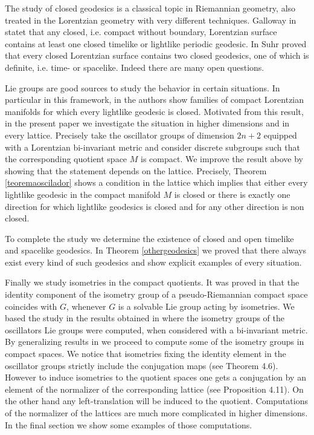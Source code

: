 \documentclass[12pt]{amsart}
\theoremstyle{plain}
\theoremstyle{definition}
\theoremstyle{remark}
\begin{document}
	The study of closed geodesics is a classical topic in Riemannian geometry, also treated in the Lorentzian geometry with very different techniques. Galloway in \cite{Ga}
	statet that any closed, i.e. compact without boundary, Lorentzian surface contains
	at least one closed timelike or lightlike periodic geodesic. In \cite{Su} Suhr proved that every closed Lorentzian surface contains two closed geodesics, one of
	which is definite, i.e. time- or spacelike. Indeed there are many open questions. 
	
	Lie groups are good sources to study the behavior in certain situations. In particular in this framework, in \cite{BOV} the authors show families of compact Lorentzian manifolds for which every lightlike geodesic is closed. Motivated from this result, in the present paper we investigate the situation in higher dimensions and in every lattice. Precisely take the oscillator groups of dimension $2n+2$ equipped with a Lorentzian bi-invariant metric and consider discrete subgroups such that the corresponding quotient space $M$ is compact.  We improve the result above by showing that the statement depends on the lattice.  Precisely, Theorem \ref{teoremaoscilador} shows a condition in the lattice which implies that either every lightlike geodesic in the compact manifold $M$ is closed or there is exactly one direction for which lightlike geodesics is closed and for any other direction is non closed. 
	
	To complete the study we determine the existence of closed and open timelike and spacelike geodesics. In Theorem \ref{othergeodesics} we proved that there always exist every kind of such geodesics and show explicit examples of every situation. 
	
	Finally we study isometries in the compact quotients. It was proved in \cite{BG} that the identity component of the isometry group of a pseudo-Riemannian compact space coincides with $G$, whenever $G$ is a solvable Lie group acting by isometries.  We based the study in the results obtained in \cite{Bou} where the isometry groups of the oscillators Lie groups were computed, when considered with a bi-invariant metric. By generalizing results in \cite{BOV} we proceed to compute some of the isometry groups in  compact spaces.  We notice that isometries fixing the identity element in the oscillator groups strictly include the conjugation maps (see Theorem 4.6). However to induce isometries to the quotient spaces one gets  a conjugation by an element of the normalizer of the corresponding lattice (see Proposition 4.11). On the other hand any left-translation will be induced to the quotient. Computations of the normalizer of the lattices are much more complicated in higher dimensions. In the final section we show some examples of those computations. 
	
\end{document}
